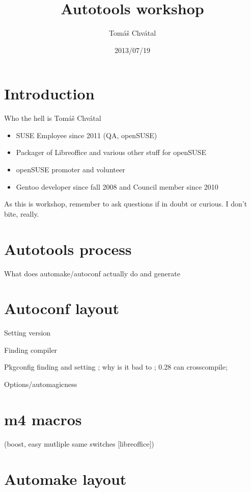 \documentclass{beamer}
\author{Tom\'{a}\v{s} Chv\'{a}tal\newline {\small openSUSE Team}}
\title{Autotools workshop}
\date{2013/07/19}
\begin{document}
\begin{frame}[t,plain]
\titlepage
\end{frame}

\section{Introduction}

\begin{frame}[t]{Who the hell is Tomáš Chvátal}
	\begin{itemize}
	\item SUSE Employee since 2011 (QA, openSUSE)
	\item Packager of Libreoffice and various other stuff for openSUSE
	\item openSUSE promoter and volunteer
	\item Gentoo developer since fall 2008 and Council member since 2010
	\end{itemize}
	\begin{center}As this is workshop, remember to ask questions if in doubt or curious. I don't bite, really.\end{center}
\end{frame}

\section{Autotools process}

\begin{frame}
\end{frame}

What does automake/autoconf actually do and generate

\section{Autoconf layout}

Setting version

Finding compiler

Pkgconfig finding and setting ; why is it bad to ; 0.28 can crosscompile;

Options/automagicness

\section{m4 macros}
(boost, easy mutliple same switches [libreoffice])

\section{Automake layout}
\end{document}
